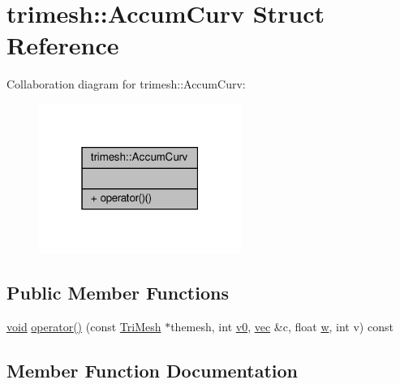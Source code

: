\hypertarget{structtrimesh_1_1AccumCurv}{}\section{trimesh\+:\+:Accum\+Curv Struct Reference}
\label{structtrimesh_1_1AccumCurv}


Collaboration diagram for trimesh\+:\+:Accum\+Curv\+:\nopagebreak
\begin{figure}[H]
\begin{center}
\leavevmode
\includegraphics[width=187pt]{dc/db6/structtrimesh_1_1AccumCurv__coll__graph}
\end{center}
\end{figure}
\subsection*{Public Member Functions}
\begin{DoxyCompactItemize}
\item 
\hyperlink{namespacetrimesh_a784ddfd979e1c579bda795a8edfc3f43}{void} \hyperlink{structtrimesh_1_1AccumCurv_a1dd283d750e5fbd4402f115065ad703d}{operator()} (const \hyperlink{classtrimesh_1_1TriMesh}{Tri\+Mesh} $\ast$themesh, int \hyperlink{namespacetrimesh_a240b3c8ea9cf01bd707862b32fa26dff}{v0}, \hyperlink{namespacetrimesh_a4fc2b83feba99c931f837a0c7d4b4df1}{vec} \&c, float \hyperlink{namespacetrimesh_acd577db8a2f95fe39ececb95e98a6c71}{w}, int v) const
\end{DoxyCompactItemize}


\subsection{Member Function Documentation}
\mbox{\label{structtrimesh_1_1AccumCurv_a1dd283d750e5fbd4402f115065ad703d}} 
